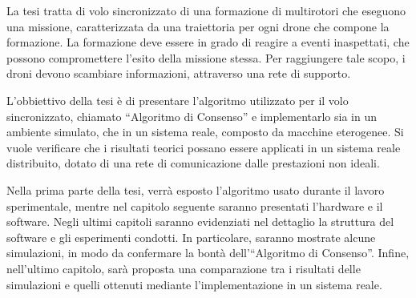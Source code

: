 
La tesi tratta di volo sincronizzato di una formazione di multirotori che eseguono una missione,
caratterizzata da una traiettoria per ogni drone che compone la formazione.
La formazione deve essere in grado di reagire a eventi inaspettati, che possono
compromettere l'esito della missione stessa.
Per raggiungere tale scopo, i droni devono scambiare informazioni, attraverso
una rete di supporto.

L'obbiettivo della tesi è di presentare l'algoritmo utilizzato per il volo sincronizzato,
chiamato “Algoritmo di Consenso” e implementarlo sia in un ambiente simulato,
che in un sistema reale, composto da macchine eterogenee. Si vuole verificare che
i risultati teorici possano essere applicati in un sistema reale distribuito, dotato di
una rete di comunicazione dalle prestazioni non ideali.

Nella prima parte della tesi, verrà esposto l'algoritmo usato durante il lavoro sperimentale,
mentre nel capitolo seguente saranno presentati l'hardware e il software.
Negli ultimi capitoli saranno evidenziati nel dettaglio la struttura del software
e gli esperimenti condotti.
In particolare, saranno mostrate alcune simulazioni, in modo da confermare la bontà
dell'“Algoritmo di Consenso”.
Infine, nell'ultimo capitolo, sarà proposta una comparazione tra i risultati
delle simulazioni e quelli ottenuti mediante l'implementazione in un sistema reale.
